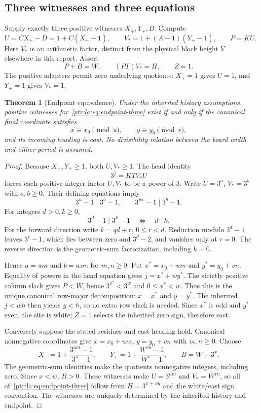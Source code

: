 \documentclass[11pt,letterpaper]{article}
\newtheorem{theorem}{Theorem}[section]
\theoremstyle{definition}\newtheorem{definition}[theorem]{Definition}
\theoremstyle{remark}\newtheorem{remark}[theorem]{Remark}
\begin{document}
\subsection{Three witnesses and three equations}
Supply exactly three positive witnesses $X_+,Y_+,B$. Compute
\[
 U=CX_+-D=1+C(X_+-1),\qquad
 V_*=1+(A-1)(Y_+-1),\qquad P=KU.
\]
Here $V_*$ is an arithmetic factor, distinct from the physical block height $V$ elsewhere in this report. Assert
\begin{equation}\label{ptr:la:eq:endpoint-three}
 P+B=W,\qquad (PT)V_*=H,\qquad Z=1.
\end{equation}
The positive adapters permit zero underlying quotients: $X_+=1$ gives $U=1$, and $Y_+=1$ gives $V_*=1$.

\begin{theorem}[Endpoint equivalence]\label{ptr:la:thm:endpoint}
Under the inherited history assumptions, positive witnesses for~\eqref{ptr:la:eq:endpoint-three} exist if and only if the canonical final coordinate satisfies
\[
 x\equiv x_0\pmod u,\qquad y\equiv y_0\pmod v,
\]
and its incoming heading is east. No divisibility relation between the board width and either period is assumed.
\end{theorem}
\begin{proof}
Because $X_+,Y_+\ge1$, both $U,V_*\ge1$. The head identity
\[
3^j=KT V_* U
\]
forces each positive integer factor $U,V_*$ to be a power of 3. Write $U=3^a$, $V_*=3^b$ with $a,b\ge0$. Their defining equations imply
\[
3^u-1\mid3^a-1,\qquad 3^{wv}-1\mid3^b-1.
\]
For integers $d>0,k\ge0$,
\begin{equation}\label{ptr:la:eq:divisor}
3^d-1\mid3^k-1\quad\Longleftrightarrow\quad d\mid k.
\end{equation}
For the forward direction write $k=qd+r$, $0\le r<d$. Reduction modulo $3^d-1$ leaves $3^r-1$, which lies between zero and $3^d-2$, and vanishes only at $r=0$. The reverse direction is the geometric-sum factorization, including $k=0$.

Hence $a=um$ and $b=wvn$ for $m,n\ge0$. Put $x^*=x_0+um$ and $y^*=y_0+vn$. Equality of powers in the head equation gives $j=x^*+wy^*$. The strictly positive column slack gives $P<W$, hence $3^{x^*}<3^w$ and $0\le x^*<w$. Thus this is the unique canonical row-major decomposition: $x=x^*$ and $y=y^*$. The inherited $j<wh$ then yields $y<h$, so no extra row slack is needed. Since $x^*$ is odd and $y^*$ even, the site is white; $Z=1$ selects the inherited zero sign, therefore east.

Conversely suppose the stated residues and east heading hold. Canonical nonnegative coordinates give $x=x_0+um$, $y=y_0+vn$ with $m,n\ge0$. Choose
\[
 X_+=1+\frac{3^{um}-1}{3^u-1},\qquad
 Y_+=1+\frac{W^{vn}-1}{W^v-1},\qquad
 B=W-3^x.
\]
The geometric-sum identities make the quotients nonnegative integers, including zero. Since $x<w$, $B>0$. These witnesses make $U=3^{um}$ and $V_*=W^{vn}$, so all of~\eqref{ptr:la:eq:endpoint-three} follow from $H=3^{x+wy}$ and the white/east sign convention. The witnesses are uniquely determined by the inherited history and endpoint.
\end{proof}
\end{document}
